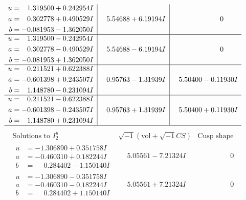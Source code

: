 \documentclass[1p]{elsarticle_modified}
\theoremstyle{definition}
\newcommand{\I}{\sqrt{-1}}
\begin{document}
$$\begin{array}{c|c|c}
\begin{aligned}
u &= \phantom{-}1.319500 + 0.242954 I \\
a &= \phantom{-}0.302778 + 0.490529 I \\
b &= -0.081953 - 1.362050 I\end{aligned}
 & \phantom{-}5.54688 + 6.19194 I & \phantom{-0.000000 } 0 \\ \hline\begin{aligned}
u &= \phantom{-}1.319500 - 0.242954 I \\
a &= \phantom{-}0.302778 - 0.490529 I \\
b &= -0.081953 + 1.362050 I\end{aligned}
 & \phantom{-}5.54688 - 6.19194 I & \phantom{-0.000000 } 0 \\ \hline\begin{aligned}
u &= \phantom{-}0.211521 + 0.622388 I \\
a &= -0.601398 + 0.243507 I \\
b &= \phantom{-}1.148780 - 0.231094 I\end{aligned}
 & \phantom{-}0.95763 - 1.31939 I & \phantom{-}5.50400 - 0.11930 I \\ \hline\begin{aligned}
u &= \phantom{-}0.211521 - 0.622388 I \\
a &= -0.601398 - 0.243507 I \\
b &= \phantom{-}1.148780 + 0.231094 I\end{aligned}
 & \phantom{-}0.95763 + 1.31939 I & \phantom{-}5.50400 + 0.11930 I\\
 \hline 
 \end{array}$$\newpage$$\begin{array}{c|c|c}  
\text{Solutions to }I^u_{2}& \I (\text{vol} + \sqrt{-1}CS) & \text{Cusp shape}\\
 \hline 
\begin{aligned}
u &= -1.306890 + 0.351758 I \\
a &= -0.460310 + 0.182244 I \\
b &= \phantom{-}0.284402 - 1.150140 I\end{aligned}
 & \phantom{-}5.05561 - 7.21324 I & \phantom{-0.000000 } 0 \\ \hline\begin{aligned}
u &= -1.306890 - 0.351758 I \\
a &= -0.460310 - 0.182244 I \\
b &= \phantom{-}0.284402 + 1.150140 I\end{aligned}
 & \phantom{-}5.05561 + 7.21324 I & \phantom{-0.000000 } 0 \\ \hline\begin{aligned}

\end{aligned}
\end{array}$$
\end{document}

